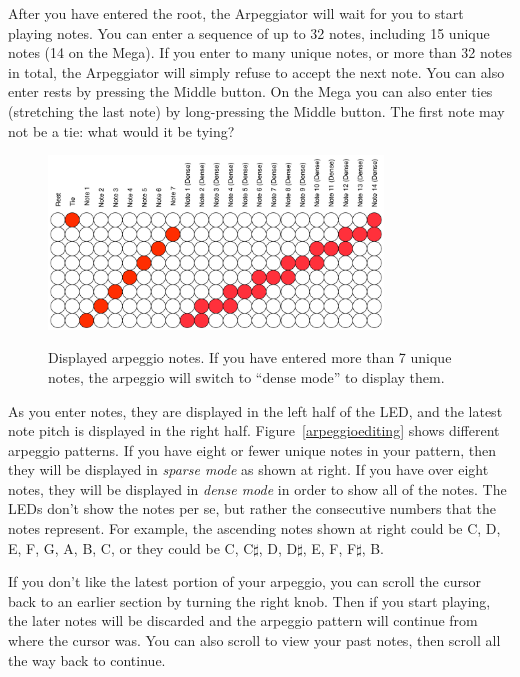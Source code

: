 \documentclass{article}
\begin{document}
After you have entered the root, the Arpeggiator will wait for you to start playing notes.  You can enter a sequence of up to 32 notes, including 15 unique notes (14 on the Mega).  If you enter to many unique notes, or more than 32 notes in total, the Arpeggiator will simply refuse to accept the next note.  You can also enter rests by pressing the Middle button.  On the Mega you can also enter ties (stretching the last note) by long-pressing the Middle button.  The first note may not be a tie: what would it be tying?

\begin{figure}
\begin{center}
\vspace{-2.5em}
\includegraphics[width=3.5in]{arpeggionotes.pdf}\\
\end{center}
\vspace{-1em}\caption{Displayed arpeggio notes.  If you have entered more than 7 unique notes, the arpeggio will switch to ``dense mode'' to display them.}
\vspace{-1em}
\label{arpeggionotes}
\end{figure}


As you enter notes, they are displayed in the left half of the LED, and the latest note pitch is displayed in the right half. Figure~\ref{arpeggioediting} shows different arpeggio patterns.  If you have eight or fewer unique notes in your pattern, then they will be displayed in {\it sparse mode} as shown at right.  If you have over eight notes, they will be displayed in {\it dense mode} in order to show all of the notes.  The LEDs don't show the notes per se, but rather the consecutive numbers that the notes represent.  For example, the ascending notes shown at right could be C, D, E, F, G, A, B, C, or they could be C, C\(\sharp\), D, D\(\sharp\), E, F, F\(\sharp\), B.

If you don't like the latest portion of your arpeggio, you can scroll the cursor back to an earlier section by turning the right knob.  Then if you start playing, the later notes will be discarded and the arpeggio pattern will continue from where the cursor was.  You can also scroll to view your past notes, then scroll all the way back to continue.
\end{document}
